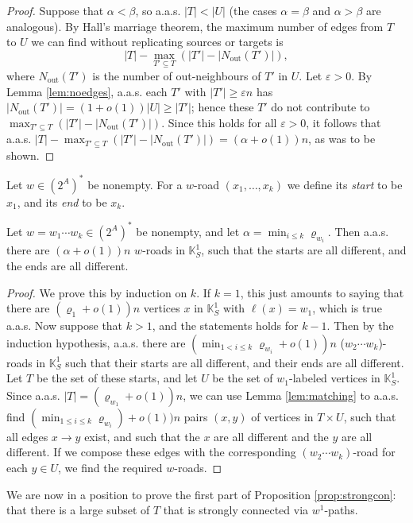 \documentclass[runngingheads]{llncs}
\begin{document}
\begin{proof}
Suppose that $\alpha < \beta$, so a.a.s. $|T| < |U|$ (the cases $\alpha = \beta$ and $\alpha > \beta$ are analogous). By Hall's marriage theorem, the maximum number of edges from $T$ to $U$ we can find without replicating sources or targets is
\[
|T|-\max_{T' \subseteq T}(|T'|-|N_{\text{out}}(T')|),
\]
where $N_{\text{out}}(T')$ is the number of out-neighbours of $T'$ in $U$. Let $\varepsilon > 0$. By Lemma \ref{lem:noedges}, a.a.s. each $T'$ with $|T'| \geq \varepsilon n$ has $|N_{\text{out}}(T')| = (1+o(1))|U| \geq |T'|$; hence these $T'$ do not contribute to $\max_{T' \subseteq T}(|T'|-|N_{\text{out}}(T')|)$. Since this holds for all $\varepsilon > 0$, it follows that a.a.s. $|T|-\max_{T' \subseteq T}(|T'|-|N_{\text{out}}(T')|) = (\alpha+o(1))n$, as was to be shown.
\end{proof}

\begin{definition}
Let $w \in (2^A)^*$ be nonempty. For a $w$-road $(x_1,\ldots,x_k)$ we define its \emph{start} to be $x_1$, and its \emph{end} to be $x_k$.
\end{definition}

\begin{lemma} \label{lem:diffroads}
Let $w = w_1\cdots w_k \in (2^A)^*$ be nonempty, and let $\alpha = \min_{i \leq k} \varrho_{w_i}$. Then a.a.s. there are $(\alpha+o(1))n$ $w$-roads in $\mathbb{K}^1_S$, such that the starts are all different, and the ends are all different.    
\end{lemma}

\begin{proof}
We prove this by induction on $k$. If $k = 1$, this just amounts to saying that there are $(\varrho_1+o(1))n$ vertices $x$ in $\mathbb{K}^1_S$ with $\ell(x) = w_1$, which is true a.a.s. Now suppose that $k > 1$, and the statements holds for $k-1$. Then by the induction hypothesis, a.a.s. there are $(\min_{1<i\leq k}\varrho_{w_i}+o(1))n$ ($w_2\cdots w_k$)-roads in $\mathbb{K}^1_S$ such that their starts are all different, and their ends are all different. Let $T$ be the set of these starts, and let $U$ be the set of $w_1$-labeled vertices in $\mathbb{K}^1_S$. Since a.a.s. $|T| = (\varrho_{w_1}+o(1))n$, we can use Lemma \ref{lem:matching} to a.a.s. find $(\min_{1\leq i\leq k}\varrho_{w_i})+o(1))n$ pairs $(x,y)$ of vertices in $T \times U$, such that all edges $x \rightarrow y$ exist, and such that the $x$ are all different and the $y$ are all different. If we compose these edges with the corresponding $(w_2\cdots w_k)$-road for each $y \in U$, we find the required $w$-roads.
\end{proof}
We are now in a position to prove the first part of Proposition \ref{prop:strongcon}: that there is a large subset  of $T$ that is strongly connected via $w^1$-paths.
\end{document}
